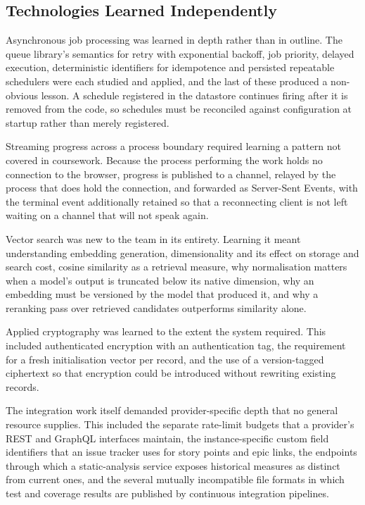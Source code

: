 \subsection{Technologies Learned Independently}
\label{subsec:tech-learned}

Asynchronous job processing was learned in depth rather than in outline. The
queue library's semantics for retry with exponential backoff, job priority,
delayed execution, deterministic identifiers for idempotence and persisted
repeatable schedulers were each studied and applied, and the last of these
produced a non-obvious lesson. A schedule registered in the datastore continues
firing after it is removed from the code, so schedules must be reconciled against
configuration at startup rather than merely registered.

Streaming progress across a process boundary required learning a pattern not
covered in coursework. Because the process performing the work holds no 
connection to the browser, progress is published to a channel, relayed by the
process that does hold the connection, and forwarded as Server-Sent Events, with
the terminal event additionally retained so that a reconnecting client is not left
waiting on a channel that will not speak again.

Vector search was new to the team in its entirety. Learning it meant
understanding embedding generation, dimensionality and its effect on storage and
search cost, cosine similarity as a retrieval measure, why normalisation matters
when a model's output is truncated below its native dimension, why an embedding
must be versioned by the model that produced it, and why a reranking pass over
retrieved candidates outperforms similarity alone.

Applied cryptography was learned to the extent the system required. This included
authenticated encryption with an authentication tag, the requirement for a fresh
initialisation vector per record, and the use of a version-tagged ciphertext so
that encryption could be introduced without rewriting existing records.

The integration work itself demanded provider-specific depth that no general
resource supplies. This included the separate rate-limit budgets that a
provider's REST and GraphQL interfaces maintain, the instance-specific custom
field identifiers that an issue tracker uses for story points and epic links, the
endpoints through which a static-analysis service exposes historical measures as
distinct from current ones, and the several mutually incompatible file formats in
which test and coverage results are published by continuous integration
pipelines.

